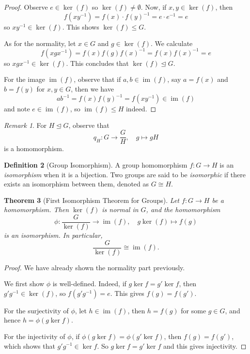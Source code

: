 \documentclass{article}
\newtheorem{theorem}{Theorem}[section]
\theoremstyle{definition}
\newtheorem{definition}[theorem]{Definition}
\theoremstyle{remark}
\newtheorem{remark}[theorem]{Remark}
\newcommand{\pqty}[1]{\left(#1\right)}
\newcommand{\flatfrac}[2]{\frac{#1}{#2}}
\newcommand{\functiondomain}[3]{#1:#2\to #3}
\newcommand{\function}[5]{#1:#2\to #3,\quad #4\mapsto #5}
\newcommand{\inverse}{^{-1}}
\newcommand{\isomorphic}{\cong}
\newcommand{\normalsub}{\trianglelefteq}
\newcommand{\subgroup}{\leq}
\newcommand{\img}{\operatorname{im}}
\begin{document}
\begin{proof}
    Observe \(e \in \ker\pqty{f}\) so \(\ker\pqty{f} \neq \emptyset\). Now, if \(x, y \in \ker\pqty{f}\), then
    \[
        f\pqty{x y \inverse} = f\pqty{x} \cdot f\pqty{y}\inverse = e \cdot e\inverse = e
    \]
    so \(x y \inverse \in \ker \pqty{f}\). This shows \(\ker \pqty{f} \subgroup G\).

    As for the normality, let \(x \in G\) and \(g \in \ker \pqty{f}\). We calculate
    \[
        f\pqty{x g x\inverse} = f\pqty{x} f\pqty{g} f\pqty{x}\inverse = f\pqty{x} f\pqty{x}\inverse = e
    \]
    so \(x g x\inverse \in \ker \pqty{f}\). This concludes that \(\ker \pqty{f} \normalsub G\).

    For the image \(\img \pqty{f}\), observe that if \(a, b \in \img\pqty{f}\), say \(a = f\pqty{x}\) and \(b = f\pqty{y}\) for \(x, y \in G\), then we have
    \[
        a b \inverse = f\pqty{x} f\pqty{y}\inverse = f\pqty{x y \inverse} \in \img \pqty{f}
    \]
    and note \(e \in \img \pqty{f}\), so \(\img \pqty{f} \subgroup H\) indeed.
\end{proof}

\begin{remark}
    For \(H \normalsub G\), observe that
    \[
        \function{q_H}{G}{\flatfrac{G}{H}}{g}{gH}
    \]
    is a homomorphism.
\end{remark}

\begin{definition}[Group Isomorphism]
    \label{def:group-isomorphism}%
    A group homomorphism \(\functiondomain{f}{G}{H}\) is an \emph{isomorphism} when it is a bijection. Two groups are said to be \emph{isomorphic} if there exists an isomorphism between them, denoted as \(G \isomorphic H\).
\end{definition}

\begin{theorem}[First Isomorphism Theorem for Groups]
    \label{thm:first-isomorphism-theorem-groups}%
    Let \(\functiondomain{f}{G}{H}\) be a homomorphism. Then \(\ker \pqty{f}\) is normal in \(G\), and the homomorphism 
    \[
        \function{\phi}{\flatfrac{G}{\ker \pqty{f}}}{\img \pqty{f}}{g \ker \pqty{f}}{f\pqty{g}}
    \]
    is an isomorphism. In particular,
    \[
        \flatfrac{G}{\ker \pqty{f}} \isomorphic \img \pqty{f}.
    \]
\end{theorem}

\begin{proof}
    We have already shown the normality part previously.

    We first show \(\phi\) is well-defined. Indeed, if \(g \ker f = g' \ker f\), then \(g' g\inverse \in \ker \pqty{f}\), so \(f\pqty{g' g\inverse} = e\). This gives \(f\pqty{g} = f\pqty{g'}\).

    For the surjectivity of \(\phi\), let \(h \in \img \pqty{f}\), then \(h = f \pqty{g}\) for some \(g \in G\), and hence \(h = \phi\pqty{g \ker f}\).

    For the injectivity of \(\phi\), if \(\phi\pqty{g \ker f} = \phi\pqty{g' \ker f}\), then \(f\pqty{g} = f\pqty{g'}\), which shows that \(g' g\inverse \in \ker f\). So \(g \ker f = g' \ker f\) and this gives injectivity.
\end{proof}
\end{document}

